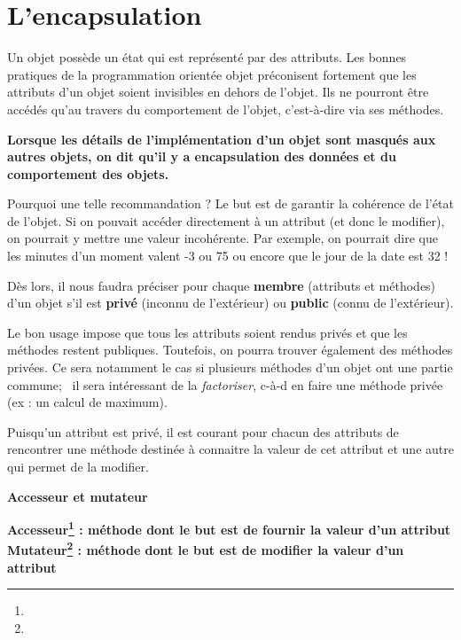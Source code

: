 \bigskip


\section{L'encapsulation}

Un objet possède un état qui est représenté par des attributs. Les
bonnes pratiques de la programmation orientée objet préconisent
fortement que les attributs d'un objet soient
invisibles en dehors de l'objet. Ils ne pourront être
accédés qu'au travers du comportement de
l'objet, c'est-à-dire via ses
méthodes.

{\sffamily\bfseries\upshape
{
Lorsque les détails de l'implémentation
d'un objet sont masqués aux autres objets, on dit
qu'il y a \textbf{encapsulation} des données et du
comportement des objets.}}


Pourquoi une telle recommandation ? Le but est de garantir la cohérence
de l'état de l'objet. Si on pouvait
accéder directement à un attribut (et donc le modifier), on pourrait y
mettre une valeur incohérente. Par exemple, on pourrait dire que les
minutes d'un moment valent -3 ou 75 ou encore que le
jour de la date est 32 !

Dès lors, il nous faudra préciser pour chaque \textbf{membre} (attributs
et méthodes) d'un objet s'il est
\textbf{privé} (inconnu de l'extérieur) ou
\textbf{public} (connu de l'extérieur). 

Le bon usage impose que tous les attributs soient rendus privés et que
les méthodes restent publiques. Toutefois, on pourra trouver également
des méthodes privées. Ce sera notamment le cas si plusieurs méthodes
d'un objet ont une partie commune; \ il sera
intéressant de la \textit{factoriser}, c-à-d en faire une méthode
privée (ex : un calcul de maximum).

Puisqu'un attribut est privé, il est courant pour
chacun des attributs de rencontrer une méthode destinée à connaitre la
valeur de cet attribut et une autre qui permet de la modifier.

{\sffamily\bfseries\upshape
Accesseur et mutateur}

{\sffamily\bfseries\upshape
{
\textbf{Accesseur}\footnote{} : méthode dont le but est de
fournir la valeur d'un attribut
\textbf{Mutateur}\footnote{} : méthode dont le but est de
modifier la valeur d'un attribut}}

